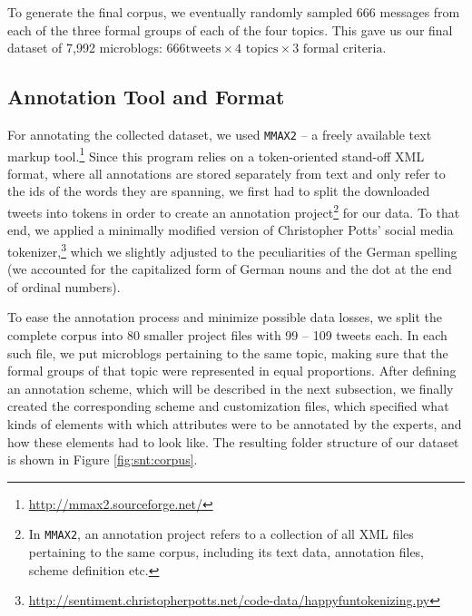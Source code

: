 To generate the final corpus, we eventually randomly sampled 666
messages from each of the three formal groups of each of the four
topics. This gave us our final dataset of 7,992 microblogs: $666\text{
  tweets} \times 4\text{ topics} \times 3\text{ formal criteria}$.

\subsection{Annotation Tool and Format}\label{subsec:snt:tformat}

For annotating the collected dataset, we used \texttt{MMAX2} -- a
freely available text markup
tool.\footnote{\url{http://mmax2.sourceforge.net/}} Since this program
relies on a token-oriented stand-off XML format, where all annotations
are stored separately from text and only refer to the ids of the words
they are spanning, we first had to split the downloaded tweets into
tokens in order to create an annotation project\footnote{In
  \texttt{MMAX2}, an annotation project refers to a collection of all
  XML files pertaining to the same corpus, including its text data,
  annotation files, scheme definition etc.} for our data.  To that
end, we applied a minimally modified version of Christopher Potts'
social media
tokenizer,\footnote{\url{http://sentiment.christopherpotts.net/code-data/happyfuntokenizing.py}}
which we slightly adjusted to the peculiarities of the German spelling
(we accounted for the capitalized form of German nouns and the dot at
the end of ordinal numbers).

To ease the annotation process and minimize possible data losses, we
split the complete corpus into 80 smaller project files with 99 -- 109
tweets each.  In each such file, we put microblogs pertaining to the
same topic, making sure that the formal groups of that topic were
represented in equal proportions.  After defining an annotation
scheme, which will be described in the next subsection, we finally
created the corresponding scheme and customization files, which
specified what kinds of elements with which attributes were to be
annotated by the experts, and how these elements had to look like.
The resulting folder structure of our dataset is shown in Figure
\ref{fig:snt:corpus}.

